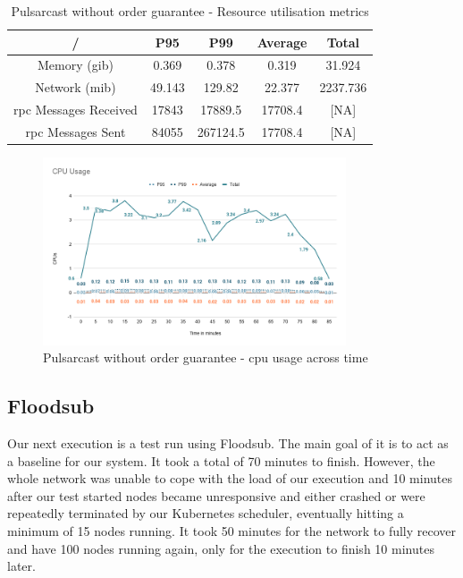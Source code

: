 \begin{table}[!htb]
\caption{Pulsarcast without order guarantee - Resource utilisation metrics}
\label{table:pulsarcast}
  \begin{center}
   \begin{tabular}{|c| c c c c|} 
   \hline
   / & P95 & P99 & Average & Total \\ [0.5ex] 
   \hline\hline
   Memory (\acrshort{gib}) & 0.369 & 0.378 & 0.319 & 31.924 \\
   \hline
   Network (\acrshort{mib}) & 49.143 & 129.82 & 22.377 & 2237.736 \\
   \hline
   \acrshort{rpc} Messages Received & 17843 & 17889.5 & 17708.4 & [NA] \\
   \hline
   \acrshort{rpc} Messages Sent & 84055 & 267124.5 & 17708.4 & [NA] \\ [1ex] 
   \hline
  \end{tabular}
  \end{center}
\end{table}

\begin{figure}[!htb]
  \centering
  \includegraphics[width=0.8\textwidth]{img/graph-pulsarcast-cpu.png}
  \caption{Pulsarcast without order guarantee - \acrshort{cpu} usage across time}
  \label{fig:graph-pulsarcast-cpu}
\end{figure}

\subsection{Floodsub}\label{subsec:floodsub}

Our next execution is a test run using Floodsub. The main goal of it is to act
as a baseline for our system. It took a total of 70 minutes to finish. However,
the whole network was unable to cope with the load of our execution and 10
minutes after our test started nodes became unresponsive and either crashed or
were repeatedly terminated by our Kubernetes scheduler, eventually hitting a
minimum of 15 nodes running. It took 50 minutes for the network to fully
recover and have 100 nodes running again, only for the execution to finish 10
minutes later.

